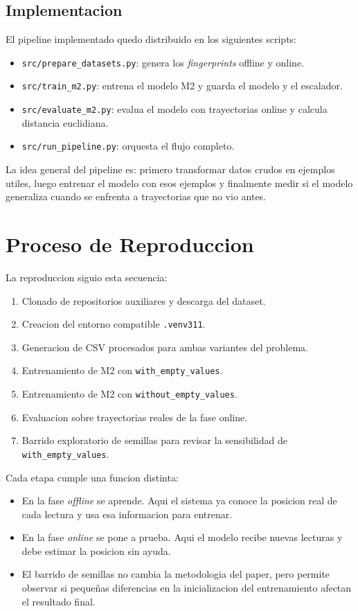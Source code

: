 \documentclass[11pt,a4paper]{article}
\begin{document}
\subsection{Implementacion}
El pipeline implementado quedo distribuido en los siguientes scripts:
\begin{itemize}
\item \texttt{src/prepare\_datasets.py}: genera los \textit{fingerprints} offline y online.
\item \texttt{src/train\_m2.py}: entrena el modelo M2 y guarda el modelo y el escalador.
\item \texttt{src/evaluate\_m2.py}: evalua el modelo con trayectorias online y calcula distancia euclidiana.
\item \texttt{src/run\_pipeline.py}: orquesta el flujo completo.
\end{itemize}

La idea general del pipeline es: primero transformar datos crudos en ejemplos utiles, luego entrenar el modelo con esos ejemplos y finalmente medir si el modelo generaliza cuando se enfrenta a trayectorias que no vio antes.

\section{Proceso de Reproduccion}
La reproduccion siguio esta secuencia:
\begin{enumerate}
\item Clonado de repositorios auxiliares y descarga del dataset.
\item Creacion del entorno compatible \texttt{.venv311}.
\item Generacion de CSV procesados para ambas variantes del problema.
\item Entrenamiento de M2 con \texttt{with\_empty\_values}.
\item Entrenamiento de M2 con \texttt{without\_empty\_values}.
\item Evaluacion sobre trayectorias reales de la fase online.
\item Barrido exploratorio de semillas para revisar la sensibilidad de \texttt{with\_empty\_values}.
\end{enumerate}

Cada etapa cumple una funcion distinta:
\begin{itemize}
\item En la fase \textit{offline} se aprende. Aqui el sistema ya conoce la posicion real de cada lectura y usa esa informacion para entrenar.
\item En la fase \textit{online} se pone a prueba. Aqui el modelo recibe nuevas lecturas y debe estimar la posicion sin ayuda.
\item El barrido de semillas no cambia la metodologia del paper, pero permite observar si pequeñas diferencias en la inicializacion del entrenamiento afectan el resultado final.
\end{itemize}
\end{document}
